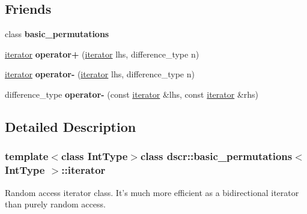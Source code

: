 \subsection*{Friends}
\begin{DoxyCompactItemize}
\item 
\hypertarget{classdscr_1_1basic__permutations_1_1iterator_a99f81faf0718d566d11f4d1a4ad187ba}{class {\bfseries basic\-\_\-permutations}}\label{classdscr_1_1basic__permutations_1_1iterator_a99f81faf0718d566d11f4d1a4ad187ba}

\item 
\hypertarget{classdscr_1_1basic__permutations_1_1iterator_aac5493422e75e70b321e439c45168fd0}{\hyperlink{classdscr_1_1basic__permutations_1_1iterator}{iterator} {\bfseries operator+} (\hyperlink{classdscr_1_1basic__permutations_1_1iterator}{iterator} lhs, difference\-\_\-type n)}\label{classdscr_1_1basic__permutations_1_1iterator_aac5493422e75e70b321e439c45168fd0}

\item 
\hypertarget{classdscr_1_1basic__permutations_1_1iterator_a87727d9351117b3726fbeac5da5eb28c}{\hyperlink{classdscr_1_1basic__permutations_1_1iterator}{iterator} {\bfseries operator-\/} (\hyperlink{classdscr_1_1basic__permutations_1_1iterator}{iterator} lhs, difference\-\_\-type n)}\label{classdscr_1_1basic__permutations_1_1iterator_a87727d9351117b3726fbeac5da5eb28c}

\item 
\hypertarget{classdscr_1_1basic__permutations_1_1iterator_a4304f5d7bb1d12de2d2ad2c1e4e64dab}{difference\-\_\-type {\bfseries operator-\/} (const \hyperlink{classdscr_1_1basic__permutations_1_1iterator}{iterator} \&lhs, const \hyperlink{classdscr_1_1basic__permutations_1_1iterator}{iterator} \&rhs)}\label{classdscr_1_1basic__permutations_1_1iterator_a4304f5d7bb1d12de2d2ad2c1e4e64dab}

\end{DoxyCompactItemize}


\subsection{Detailed Description}
\subsubsection*{template$<$class Int\-Type$>$class dscr\-::basic\-\_\-permutations$<$ Int\-Type $>$\-::iterator}

Random access iterator class. It's much more efficient as a bidirectional iterator than purely random access. 

